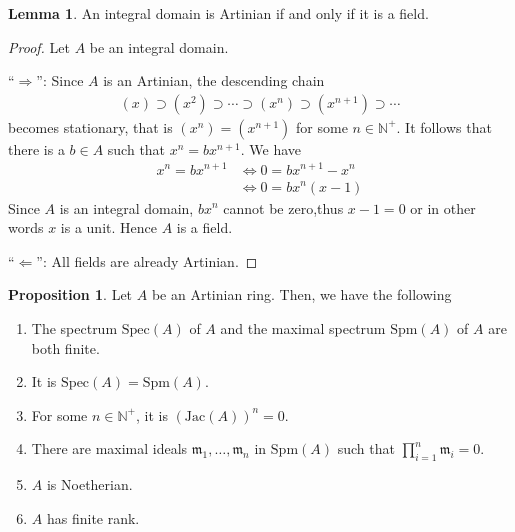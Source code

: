 \documentclass[a4paper]{book}
\theoremstyle{definition}
\newtheorem{lemma}[definition]{Lemma}
\newtheorem{proposition}[definition]{Proposition}
\begin{document}
\begin{thmbox}
    \begin{lemma}
        An integral domain is Artinian if and only if it is a field.
    \end{lemma}
\end{thmbox}
\begin{proof}
    Let \(A\) be an integral domain.

    ``\(\Rightarrow\)'': Since \(A\) is an Artinian, the descending chain
    \begin{align*}
        (x) \supset (x^2) \supset \cdots \supset (x^n) \supset (x^{n+1}) \supset \cdots
    \end{align*}
    becomes stationary, that is \((x^n) = (x^{n+1})\) for some \(n \in \mathbb{N}^+\). It follows that there is a \(b \in A\) such that \(x^n = b x^{n+1}\). We have
    \begin{align*}
        x^n = b x^{n+1} &\iff 0 = b x^{n+1} - x^{n}\\
        &\iff 0 = bx^n (x - 1)
    \end{align*}
    Since \(A\) is an integral domain, \(bx^n\) cannot be zero,thus \(x - 1 = 0\) or in other words \(x\) is a unit. Hence \(A\) is a field.

    ``\(\Leftarrow\)'': All fields are already Artinian.
\end{proof}


\begin{thmbox}
    \begin{proposition}
        Let \(A\) be an Artinian ring. Then, we have the following
        \begin{enumerate}
            \item The spectrum \(\mathrm{Spec}(A)\) of \(A\) and the maximal spectrum \(\mathrm{Spm}(A)\) of \(A\) are both finite.
            \item It is \(\mathrm{Spec}(A) = \mathrm{Spm}(A)\).
            \item For some \(n \in \mathbb{N}^+\), it is \((\mathrm{Jac}(A))^n = 0\).
            \item There are maximal ideals \(\mathfrak{m}_1, \ldots, \mathfrak{m}_n\) in \(\mathrm{Spm}(A)\) such that \(\prod_{i = 1}^n \mathfrak{m}_i = 0\).
            \item \(A\) is Noetherian.
            \item \(A\) has finite rank.
        \end{enumerate}
    \end{proposition}
\end{thmbox}
\end{document}
